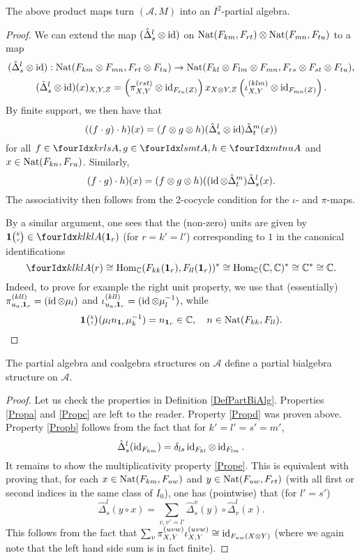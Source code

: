 \begin{Lem} The above product maps turn $(\mathscr{A},M)$ into an $I^2$-partial algebra.
\end{Lem}
\begin{proof} We can extend the map $(\hat{\Delta}^l_s\otimes \operatorname{id})$ on $\operatorname{\mathrm{Nat}}(F_{km},F_{rt})\otimes \operatorname{\mathrm{Nat}}(F_{mn},F_{tu})$ to a map \[(\hat{\Delta}^l_s\otimes \operatorname{id}): \operatorname{\mathrm{Nat}}(F_{km}\otimes F_{mn},F_{rt}\otimes F_{tu}) \rightarrow  \operatorname{\mathrm{Nat}}(F_{kl}\otimes F_{lm}\otimes F_{mn},F_{rs}\otimes F_{st}\otimes F_{tu}),\] \[(\hat{\Delta}^l_s\otimes \operatorname{id})(x)_{X,Y,Z} = \left(\pi^{(rst)}_{X,Y}\otimes \operatorname{id}_{F_{tu}(Z)}\right) x_{X\otimes Y, Z} \left(\iota^{(klm)}_{X,Y} \otimes \operatorname{id}_{F_{mn}(Z)}\right).\]
By finite support, we then have that \[((f\cdot g)\cdot h)(x) = (f\otimes g\otimes h)(\hat{\Delta}^l_s\otimes \operatorname{id})\hat{\Delta}^m_t(x))\] for all $f\in \Gr{A}{k}{l}{r}{s},g\in \Gr{A}{l}{m}{s}{t},h\in \Gr{A}{m}{n}{t}{u}$ and $x\in  \operatorname{\mathrm{Nat}}(F_{kn},F_{ru})$. Similarly, \[(f\cdot g)\cdot h)(x) = (f\otimes g\otimes h)((\operatorname{id}\otimes \hat{\Delta}^m_t)\hat{\Delta}^l_s(x).\] The associativity then follows from the 2-cocycle condition for the $\iota$- and $\pi$-maps. 

By a similar argument, one sees that the (non-zero) units are given by $\UnitC{k}{r}\in \Gr{A}{k}{k}{l}{l}(\Unit_{r})$  (for $r=k'=l'$) corresponding to $1$ in the canonical identifications  \[\Gr{A}{k}{k}{l}{l}(r) \cong \Hom_{\C}(\Forget_{kk}(\Unit_{r}),\Forget_{ll}(\Unit_{r}))^*\cong \Hom_{\C}(\C,\C)^*  \cong \C^* \cong \C.\] Indeed, to prove for example the right unit property, we use that (essentially) $\pi_{u_a,\mathbf{1}_{r}}^{(kll)} =(\operatorname{id}\otimes \mu_l)$ and $\iota_{u_a,\mathbf{1}_{r}}^{(kll)} = (\operatorname{id}\otimes \mu_l^{-1})$, while \[\mathbf{1}{\tiny {\begin{pmatrix} k\\l\end{pmatrix}}}(\mu_ln_{\mathbf{1}_{r}}\mu_k^{-1}) = n_{\mathbf{1}_{r}} \in \mathbb{C},\quad n\in \operatorname{\mathrm{Nat}}(F_{kk},F_{ll}).\] %
\end{proof} 

\begin{Prop} The partial algebra and coalgebra structures on $\mathscr{A}$ define a partial bialgebra structure on $\mathscr{A}$. 
\end{Prop}
\begin{proof} Let us check the properties in Definition \ref{DefPartBiAlg}. Properties \ref{Propa} and \ref{Propc} are left to the reader. Property \ref{Propd} was proven above. Property \ref{Propb} follows from the fact that for $k'=l'=s'=m'$, \[\hat{\Delta}^{l}_s(\operatorname{id}_{F_{km}}) = \delta_{ls} \operatorname{id}_{F_{kl}}\otimes \operatorname{id}_{F_{lm}}.\] 
It remains to show the multiplicativity property \ref{Prope}. This is equivalent with proving that, for each $x\in \operatorname{\mathrm{Nat}}(F_{km},F_{uw})$ and $y\in \operatorname{\mathrm{Nat}}(F_{uw},F_{rt})$ (with all first or second indices in the same class of $I_0$), one has (pointwise) that (for $l'=s'$) \[ \hat{\Delta}^l_s(y\circ x) = \sum_{v,v'=l'} \hat{\Delta}^v_s(y)\circ \hat{\Delta}^l_v(x).\] This follows from the fact that $\sum_v \pi^{(uvw)}_{X,Y}\iota^{(uvw)}_{X,Y} \cong \operatorname{id}_{F_{uw}(X\otimes Y)}$ (where we again note that the left hand side sum is in fact finite).
\end{proof} 

